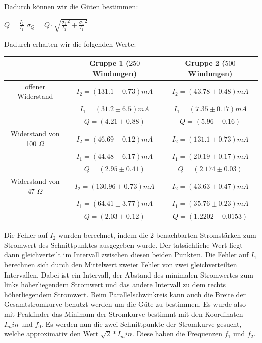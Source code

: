 \documentclass[a4paper, 11pt]{article}
\begin{document}
Dadurch können wir die Güten bestimmen:
\begin{center}
$ Q= \frac{I_2}{I_1}$
\; \; \:
$ \sigma_Q=Q \cdot \sqrt{\frac{\sigma_1}{I_1}^2+\frac{\sigma_1}{I_1}^2}
$
\end{center}
Dadurch erhalten wir die folgenden Werte:
\begin{center}


\begin{tabular}{|c|c|c|}
\hline 	$ $ 	&	Gruppe 1 ($250$ Windungen)	&	Gruppe 2 ($500$ Windungen) \\
\hline 	offener Widerstand 	&	$ I_2 = (131.1 \pm 0.73) mA$					&	$ I_2 = (43.78 \pm 0.48) mA$	\\
\hline 	$ $ 	&	$ I_1 = (31.2 \pm 6.5) mA$					&	$ I_1 = (7.35 \pm 0.17) mA$	\\
\hline 		&	$ Q = (4.21 \pm 0.88) $	&	$ Q = (5.96 \pm 0.16)  $ \\
\hline	Widerstand von 100 $\Omega$	&	$ I_2 = (46.69 \pm 0.12) mA$					&	$ I_2 = (131.1 \pm 0.73) mA$	\\
\hline 	$ $ 	&	$ I_1 = (44.48 \pm 6.17) mA$					&	$ I_1 = (20.19 \pm 0.17) mA$	\\
\hline 		&	$ Q = (2.95 \pm 0.41)$	&	$ Q = (2.174 \pm 0.03)  $ \\
\hline	Widerstand von 47 $\Omega$	&	$ I_2 = (130.96 \pm 0.73) mA$					&	$ I_2 = (43.63 \pm 0.47) mA$	\\
\hline 	$ $ 	&	$ I_1 = (64.41 \pm 3.77) mA$					&	$ I_1 = (35.76 \pm 0.23) mA$	\\
\hline 		&	$ Q = (2.03 \pm 0.12) $	&	$ Q = (1.2202 \pm 0.0153)  $ \\
\hline	

\end{tabular}
\end{center}

Die Fehler auf $I_2$ wurden berechnet, indem die 2 benachbarten Stromstärken zum Stromwert des Schnittpunktes ausgegeben wurde. Der tatsächliche Wert liegt dann gleichverteilt im Intervall zwischen diesen beiden Punkten.
Die Fehler auf $I_1$ berechnen sich durch den Mittelwert zweier Fehler von zwei gleichverteilten Intervallen. Dabei ist ein Intervall, der Abstand des minimalen Stromwertes zum links höherliegendem Stromwert und das andere Intervall zu dem rechts höherliegendem Stromwert.
\newline
\newline
Beim Parallelschwinkreis kann auch die Breite der Gesamtstromkurve benutzt werden um die Güte zu bestimmen.
Es wurde also mit Peakfinder das Minimum der Stromkurve bestimmt mit den Koordinaten $I_min$ und $f_0$. Es werden nun die zwei Schnittpunkte der Stromkurve gesucht, welche approximativ den Wert $\sqrt{2}*I_min$. Diese haben die Frequenzen $f_1$ und $f_2$.
\end{document}
